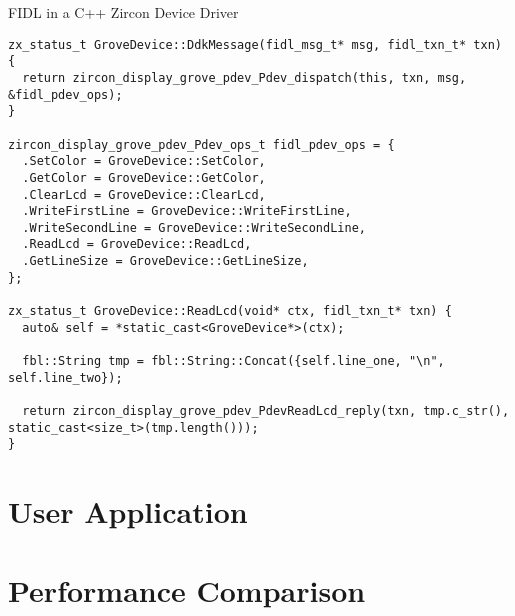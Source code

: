 \begin{listing} [H]
\caption{FIDL in a C++ Zircon Device Driver}
\label{lst:cppmessage}
\begin{verbatim}
zx_status_t GroveDevice::DdkMessage(fidl_msg_t* msg, fidl_txn_t* txn) {
  return zircon_display_grove_pdev_Pdev_dispatch(this, txn, msg, &fidl_pdev_ops);
}

zircon_display_grove_pdev_Pdev_ops_t fidl_pdev_ops = {
  .SetColor = GroveDevice::SetColor,
  .GetColor = GroveDevice::GetColor,
  .ClearLcd = GroveDevice::ClearLcd,
  .WriteFirstLine = GroveDevice::WriteFirstLine,
  .WriteSecondLine = GroveDevice::WriteSecondLine,
  .ReadLcd = GroveDevice::ReadLcd,
  .GetLineSize = GroveDevice::GetLineSize,
};

zx_status_t GroveDevice::ReadLcd(void* ctx, fidl_txn_t* txn) {
  auto& self = *static_cast<GroveDevice*>(ctx);

  fbl::String tmp = fbl::String::Concat({self.line_one, "\n", self.line_two});

  return zircon_display_grove_pdev_PdevReadLcd_reply(txn, tmp.c_str(), static_cast<size_t>(tmp.length()));
}
\end{verbatim}
\end{listing}


\section{User Application}

\section{Performance Comparison}

